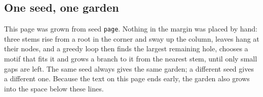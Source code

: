 \documentclass[11pt,a4paper]{article}
\begin{document}
\ifdefined\galleryage\florilegiumage{\galleryage}\fi
\setcounter{section}{3}\setcounter{subsection}{1}
\subsection{One seed, one garden}

This page was grown from seed \texttt{\ifx\florilegiumseed\empty page\else\florilegiumseed\fi}.
Nothing in the margin was placed by hand: three stems rise from a root in the corner and
sway up the column, leaves hang at their nodes, and a greedy loop then finds the largest
remaining hole, chooses a motif that fits it and grows a branch to it from the nearest
stem, until only small gaps are left. The same seed always gives the same garden; a
different seed gives a different one. Because the text on this page ends early, the
garden also grows into the space below these lines.
\florilegiumtextend
\end{document}
